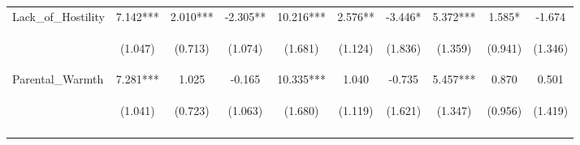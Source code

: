 \begin{tabular}{lccccccccc}
\noalign{\smallskip}Lack_of_Hostility & 7.142*** & 2.010*** & -2.305** & 10.216*** & 2.576** & -3.446* & 5.372*** & 1.585* & -1.674\\
 & \begin{footnotesize}(1.047)\end{footnotesize} & \begin{footnotesize}(0.713)\end{footnotesize} & \begin{footnotesize}(1.074)\end{footnotesize} & \begin{footnotesize}(1.681)\end{footnotesize} & \begin{footnotesize}(1.124)\end{footnotesize} & \begin{footnotesize}(1.836)\end{footnotesize} & \begin{footnotesize}(1.359)\end{footnotesize} & \begin{footnotesize}(0.941)\end{footnotesize} & \begin{footnotesize}(1.346)\end{footnotesize}\\
\noalign{\smallskip}Parental_Warmth & 7.281*** & 1.025 & -0.165 & 10.335*** & 1.040 & -0.735 & 5.457*** & 0.870 & 0.501\\
 & \begin{footnotesize}(1.041)\end{footnotesize} & \begin{footnotesize}(0.723)\end{footnotesize} & \begin{footnotesize}(1.063)\end{footnotesize} & \begin{footnotesize}(1.680)\end{footnotesize} & \begin{footnotesize}(1.119)\end{footnotesize} & \begin{footnotesize}(1.621)\end{footnotesize} & \begin{footnotesize}(1.347)\end{footnotesize} & \begin{footnotesize}(0.956)\end{footnotesize} & \begin{footnotesize}(1.419)\end{footnotesize}\\
\noalign{\smallskip}\hline\end{tabular}\\
